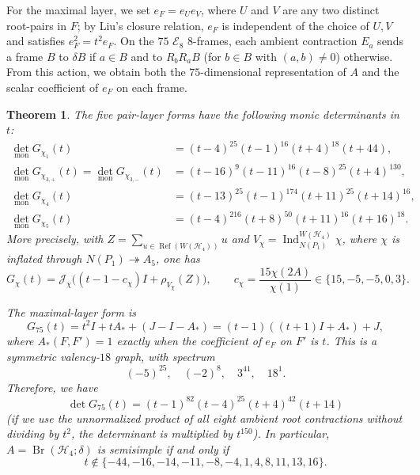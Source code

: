 \documentclass[11pt,a4paper]{amsart}
\newtheorem{theorem}{Theorem}[section]
\theoremstyle{uprightdefinition}
\theoremstyle{remark}\newtheorem{remark}[theorem]{Remark}
\begin{document}
For the maximal layer, we set $e_F=e_Ue_V$, where $U$ and $V$ are any two distinct
root-pairs in $F$; by Liu's closure relation, $e_F$ is independent of the
choice of $U,V$ and satisfies $e_F^2=t^2e_F$. On the $75$ $\mathscr{E}_8$ $8$-frames, each ambient contraction $E_a$ sends a frame $B$
to $\delta B$ if $a\in B$ and to $R_bR_aB$ (for $b\in B$ with $(a,b)\ne0$) otherwise. From this action, we obtain both the $75$-dimensional representation of $A$
and the scalar coefficient of $e_F$ on each frame.

\begin{theorem}\label{thm:H4-complete-criterion}
The five pair-layer forms have the following monic determinants in $t$:
\begin{align*}
 \det_{\mathrm{mon}}G_{\chi_1}(t)
   &=(t-4)^{25}(t-1)^{16}(t+4)^{18}(t+44),\\
 \det_{\mathrm{mon}}G_{\chi_{3,+}}(t)
 =\det_{\mathrm{mon}}G_{\chi_{3,-}}(t)
   &=(t-16)^9(t-11)^{16}(t-8)^{25}(t+4)^{130},\\
 \det_{\mathrm{mon}}G_{\chi_4}(t)
   &=(t-13)^{25}(t-1)^{174}(t+11)^{25}(t+14)^{16},\\
 \det_{\mathrm{mon}}G_{\chi_5}(t)
   &=(t-4)^{216}(t+8)^{50}(t+11)^{16}(t+16)^{18}.
\end{align*}
More precisely, with
$Z=\sum_{u\in\operatorname{Ref}(W(\mathscr{H}_4))}u$ and
$V_\chi=\operatorname{Ind}_{N(P_1)}^{W(\mathscr{H}_4)}\chi$, where $\chi$ is inflated
through $N(P_1)\twoheadrightarrow A_5$, one has
\begin{equation}\label{eq:H4-casimir}
 G_\chi(t)=\mathcal J_\chi
 \bigl((t-1-c_\chi)I+\rho_{V_\chi}(Z)\bigr),
 \qquad c_\chi=\frac{15\chi(2A)}{\chi(1)}
       \in\{15,-5,-5,0,3\}.
\end{equation}

The maximal-layer form is
\begin{equation}\label{eq:H4-G75}
 G_{75}(t)=t^2I+tA_*+(J-I-A_*)
          =(t-1)((t+1)I+A_*)+J,
\end{equation}
where $A_*(F,F')=1$ exactly when the coefficient of $e_F$ on $F'$ is $t$.
This is a symmetric valency-$18$ graph, with spectrum
\[
 (-5)^{25},\quad(-2)^8,\quad3^{41},\quad18^1.
\]
Therefore, we have
\begin{equation}\label{eq:H4-det-75}
 \det G_{75}(t)=(t-1)^{82}(t-4)^{25}(t+4)^{42}(t+14)
\end{equation}
(if we use the unnormalized product of all eight ambient root contractions without dividing by $t^2$, the determinant is multiplied by $t^{150}$).
In particular, $A=\operatorname{Br}(\mathscr{H}_4;\delta)$ is semisimple if and only if
\begin{equation}\label{eq:H4-bad-set}
 t\notin\{-44,-16,-14,-11,-8,-4,1,4,8,11,13,16\}.
\end{equation}
\end{theorem}
\end{document}
